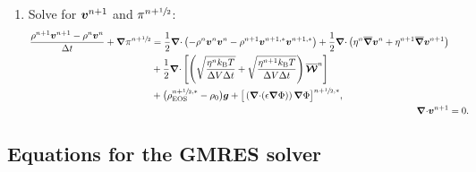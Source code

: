 \documentclass[
10pt
showpacs, showkeys,
amsmath,amssymb,
aps,
pre,
floatfix,
]{revtex4-1}
\newcommand{\divg}{{\V\nabla\cdot}}                       %
\begin{document}
\begin{enumerate}
\item Solve for $\boldsymbol{v}^{n+1}$ and $\pi^{n+\sfrac{1}{2}}$:
\begin{align}
\label{boussinesq_stokes_v_2nd}
\begin{split}
\frac{\rho^{n+1}\V{v}^{n+1}-\rho^n\V{v}^n}{\D{t}} + \grad\pi^{n+\myhalf}
&= \frac{1}{2}\divg\left(-\rho^n\V{v}^n\V{v}^n-\rho^{n+1}\V{v}^{n+1,*}\V{v}^{n+1,*}\right) 
+ \frac{1}{2}\divg\left( \eta^n \overline{\grad}\V{v}^n + \eta^{n+1} \overline{\grad}\V{v}^{n+1} \right) \\
&+ \frac{1}{2}\divg\left[\left( \sqrt{\frac{\eta^n k_\mathrm{B}T}{\D{V}\D{t}}} + \sqrt{\frac{\eta^{n+1} k_\mathrm{B}T}{\D{V}\D{t}}} \right) \overline{\V{\mathcal{W}}}^n \right] \\
&+ \big(\rho^{n+\myhalf,*}_\mathrm{EOS}-\rho_0\big)\V{g} 
+ \big[\left(\divg(\epsilon\grad\Phi)\right)\grad\Phi\big]^{n+\myhalf,*}, 
\end{split} \\
\label{boussinesq_stokes_p_2nd}
\divg\V{v}^{n+1} & = 0.
\end{align}

\end{enumerate}

\clearpage

\subsection*{Equations for the GMRES solver}
\end{document}
